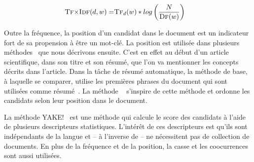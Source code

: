 \begin{align}
    \textsc{Tf$\times$Idf}(d, w) = & \textsc{Tf}_d(w) * log\left( \frac{N}{\textsc{Df}(w)} \right) \label{eq:tfidf}
\end{align}



Outre la fréquence, la position d'un candidat dans le document est un indicateur fort de sa propension à être un mot-clé. La position est utilisée dans plusieurs méthodes~\cite[\textit{inter alia}]{witten_kea:_1999,goh_keyphrase_2007,campos_yake_2020} que nous décrivons ensuite.
C'est en effet au début d'un article scientifique, dans son titre et son résumé, que l'on va mentionner les concepts décrits dans l'article.
Dans la tâche de résumé automatique, la méthode de base, à laquelle se comparer, utilise les premières phrases du document qui sont utilisées comme résumé~\cite{brandow_automatic_1995}.
La méthode ~\cite{gallina_large-scale_2020} s'inspire de cette méthode et ordonne les candidats selon leur position dans le document.

\iffalse
\begin{align}
    \text{score}(d, w) = & \frac{pos(w)}{|d|}) \label{eq:firstphrases}
\end{align}
\fi

La méthode YAKE!~\cite{campos_yake_2020} est une méthode qui calcule le score des candidats à l'aide de plusieurs descripteurs statistiques.
L'intérêt de ces descripteurs est qu'ils sont indépendants de la langue et -- à l'inverse de \tfidf{} -- ne nécessitent pas de collection de documents.
En plus de la fréquence et de la position, la casse et les coocurrences sont aussi utilisées.



